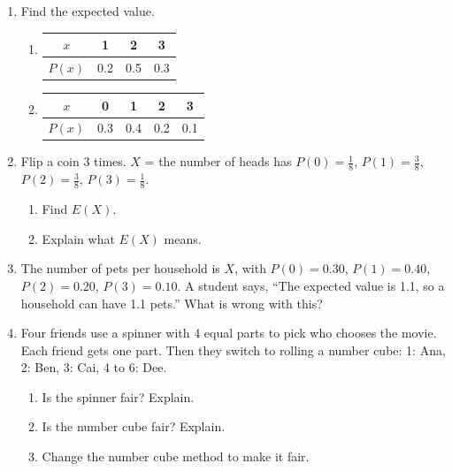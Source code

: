 \documentclass[11pt]{article}
\begin{document}
\newpage
\begin{enumerate}

\item Find the expected value.
\begin{enumerate}[itemsep=1em]
  \item \begin{tabular}{|c|c|c|c|}\hline $x$ & 1 & 2 & 3\\ \hline $P(x)$ & 0.2 & 0.5 & 0.3\\ \hline\end{tabular}

  \work{2em}
  \item \begin{tabular}{|c|c|c|c|c|}\hline $x$ & 0 & 1 & 2 & 3\\ \hline $P(x)$ & 0.3 & 0.4 & 0.2 & 0.1\\ \hline\end{tabular}

\end{enumerate}
\work{2em}

\item Flip a coin 3 times. $X$ = the number of heads has $P(0) = \frac{1}{8}$, $P(1) = \frac{3}{8}$, $P(2) = \frac{3}{8}$, $P(3) = \frac{1}{8}$.
\begin{enumerate}[itemsep=1em]
  \item Find $E(X)$. 
  \work{2em}
  \item Explain what $E(X)$ means. 
\end{enumerate}
\work{2em}

\item The number of pets per household is $X$, with $P(0) = 0.30$, $P(1) = 0.40$, $P(2) = 0.20$, $P(3) = 0.10$.
A student says, ``The expected value is 1.1, so a household can have 1.1 pets.'' What is wrong with this?

\work{3em}

\newpage
\item Four friends use a spinner with 4 equal parts to pick who chooses the movie. Each friend gets one part.
Then they switch to rolling a number cube: 1: Ana, 2: Ben, 3: Cai, 4 to 6: Dee.
\begin{enumerate}[itemsep=1em]
  \item Is the spinner fair? Explain. 
  \work{2em}
  \item Is the number cube fair? Explain. 
  \work{2em}
  \item Change the number cube method to make it fair.


\end{enumerate}
\end{enumerate}
\end{document}
